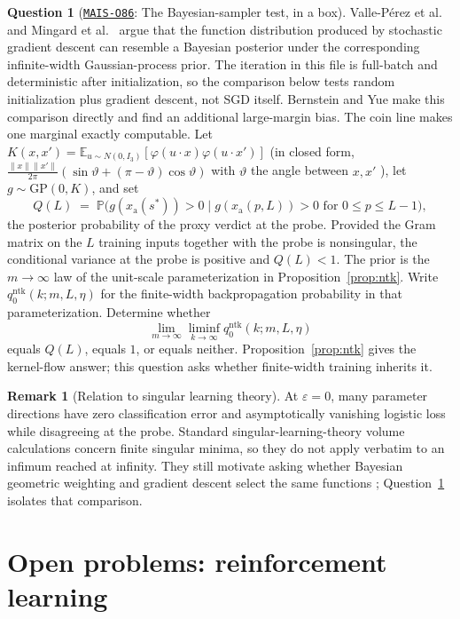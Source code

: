\documentclass[11pt]{amsart}
\newcommand{\Oid}[1]{\href{https://github.com/lionellevine/MAIS/blob/main/open-problems/MAIS-O#1.md}{\texttt{MAIS-O#1}}}
\theoremstyle{plain}
\theoremstyle{definition}
\newtheorem{question}[theorem]{Question}
\newtheorem{remark}[theorem]{Remark}
\begin{document}
\begin{question}[\Oid{86}: The Bayesian-sampler test, in a box]\label{q:bayes}
Valle-P\'erez et al.~\cite{valleperez2019} and Mingard et al.~\cite{mingard2021} argue that the function distribution produced by stochastic gradient descent can resemble a Bayesian posterior under the corresponding infinite-width Gaussian-process prior. The iteration in this file is full-batch and deterministic after initialization, so the comparison below tests random initialization plus gradient descent, not SGD itself. Bernstein and Yue \cite{bernstein2022} make this comparison directly and find an additional large-margin bias. The coin line makes one marginal exactly computable. Let $K(x,x')=\mathbb E_{u\sim N(0,I_3)}[\varphi(u\cdot x)\varphi(u\cdot x')]$ (in closed form, $\frac{\|x\|\|x'\|}{2\pi}(\sin\vartheta+(\pi-\vartheta)\cos\vartheta)$ with $\vartheta$ the angle between $x,x'$ \cite{chosaul2009}), let $g\sim \mathrm{GP}(0,K)$, and set
\[
   Q(L)\;=\;\mathbb P\bigl(g(x_{\mathrm a}(s^{*}))>0 \;\big|\; g(x_{\mathrm a}(p,L))>0 \text{ for } 0\le p\le L-1\bigr),
\]
the posterior probability of the proxy verdict at the probe. Provided the Gram matrix on the $L$ training inputs together with the probe is nonsingular, the conditional variance at the probe is positive and $Q(L)<1$. The prior is the $m\to\infty$ law of the unit-scale parameterization in Proposition~\ref{prop:ntk}. Write $q^{\mathrm{ntk}}_0(k;m,L,\eta)$ for the finite-width backpropagation probability in that parameterization. Determine whether
\[
\lim_{m\to\infty}\liminf_{k\to\infty}q^{\mathrm{ntk}}_0(k;m,L,\eta)
\]
equals $Q(L)$, equals $1$, or equals neither. Proposition~\ref{prop:ntk} gives the kernel-flow answer; this question asks whether finite-width training inherits it.
\end{question}

\begin{remark}[Relation to singular learning theory]
At $\varepsilon=0$, many parameter directions have zero classification error and asymptotically vanishing logistic loss while disagreeing at the probe. Standard singular-learning-theory volume calculations concern finite singular minima, so they do not apply verbatim to an infimum reached at infinity. They still motivate asking whether Bayesian geometric weighting and gradient descent select the same functions \cite{watanabe2009,lehalleur2025}; Question~\ref{q:bayes} isolates that comparison.
\end{remark}

\section{Open problems: reinforcement learning}\label{sec:rl}
\end{document}
